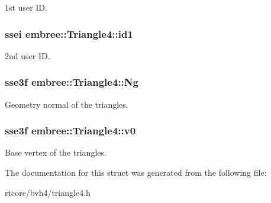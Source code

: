 1st user ID. 

\hypertarget{structembree_1_1_triangle4_af3ef7b3e6c8140aad0ee6de92083348b}{
\subsubsection[{id1}]{\setlength{\rightskip}{0pt plus 5cm}ssei {\bf embree::Triangle4::id1}}}
\label{structembree_1_1_triangle4_af3ef7b3e6c8140aad0ee6de92083348b}


2nd user ID. 

\hypertarget{structembree_1_1_triangle4_a0ab213645841eb42897e3d61a9cd3528}{
\subsubsection[{Ng}]{\setlength{\rightskip}{0pt plus 5cm}sse3f {\bf embree::Triangle4::Ng}}}
\label{structembree_1_1_triangle4_a0ab213645841eb42897e3d61a9cd3528}


Geometry normal of the triangles. 

\hypertarget{structembree_1_1_triangle4_a6c0d196de65c16626387c56ba45b019d}{
\subsubsection[{v0}]{\setlength{\rightskip}{0pt plus 5cm}sse3f {\bf embree::Triangle4::v0}}}
\label{structembree_1_1_triangle4_a6c0d196de65c16626387c56ba45b019d}


Base vertex of the triangles. 



The documentation for this struct was generated from the following file:\begin{DoxyCompactItemize}
\item 
rtcore/bvh4/triangle4.h\end{DoxyCompactItemize}

